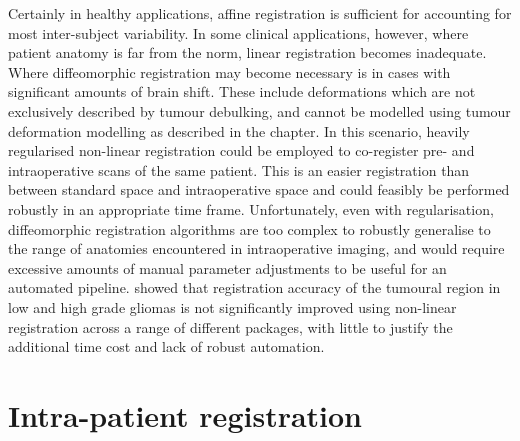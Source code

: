 Certainly in healthy applications, affine registration is sufficient for accounting for most inter-subject variability.
In some clinical applications, however, where patient anatomy is far from the norm, linear registration becomes inadequate.
Where diffeomorphic registration may become necessary is in cases with significant amounts of brain shift.
These include deformations which are not exclusively described by tumour debulking, and cannot be modelled using tumour deformation modelling as described in the  chapter.
In this scenario, heavily regularised non-linear registration could be employed to co-register pre- and intraoperative scans of the same patient.
This is an easier registration than between standard space and intraoperative space and could feasibly be performed robustly in an appropriate time frame.
Unfortunately, even with regularisation, diffeomorphic registration algorithms are too complex to robustly generalise to the range of anatomies encountered in intraoperative imaging, and would require excessive amounts of manual parameter adjustments to be useful for an automated pipeline.
\textcite{Visser2020} showed that registration accuracy of the tumoural region in low and high grade gliomas is not significantly improved using non-linear registration across a range of different packages, with little to justify the additional time cost and lack of robust automation.

\section{Intra-patient registration}
